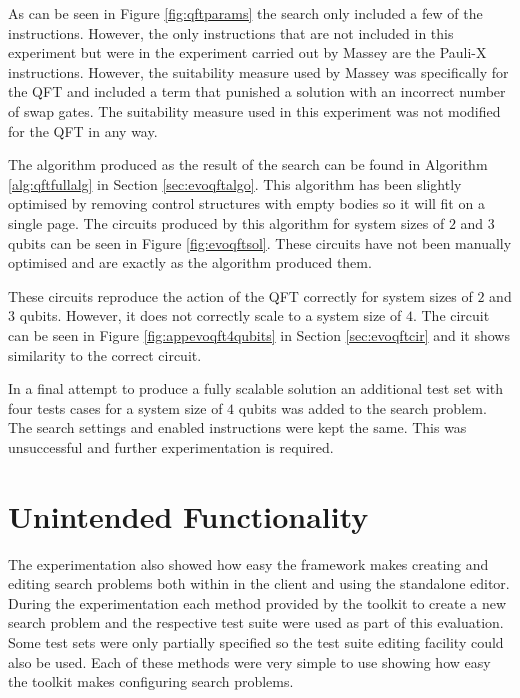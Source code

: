 As can be seen in Figure \ref{fig:qftparams} the search only included a few of the instructions.
However, the only instructions that are not included in this experiment but were in the experiment carried out by Massey are the Pauli-X instructions.
However, the suitability measure used by Massey was specifically for the QFT and included a term that punished a solution with an incorrect number of swap gates.
The suitability measure used in this experiment was not modified for the QFT in any way.

The algorithm produced as the result of the search can be found in Algorithm \ref{alg:qftfullalg} in Section \ref{sec:evoqftalgo}.
This algorithm has been slightly optimised by removing control structures with empty bodies so it will fit on a single page.
The circuits produced by this algorithm for system sizes of $2$ and $3$ qubits can be seen in Figure \ref{fig:evoqftsol}.
These circuits have not been manually optimised and are exactly as the algorithm produced them.

These circuits reproduce the action of the QFT correctly for system sizes of $2$ and $3$ qubits.
However, it does not correctly scale to a system size of $4$.
The circuit can be seen in Figure \ref{fig:appevoqft4qubits} in Section \ref{sec:evoqftcir} and it shows similarity to the correct circuit.

In a final attempt to produce a fully scalable solution an additional test set with four tests cases for a system size of $4$ qubits was added to the search problem.
The search settings and enabled instructions were kept the same.
This was unsuccessful and further experimentation is required.




\section{Unintended Functionality}

The experimentation also showed how easy the framework makes creating and editing search problems both within in the client and using the standalone editor.
During the experimentation each method provided by the toolkit to create a new search problem and the respective test suite were used as part of this evaluation.
Some test sets were only partially specified so the test suite editing facility could also be used.
Each of these methods were very simple to use showing how easy the toolkit makes configuring search problems.

